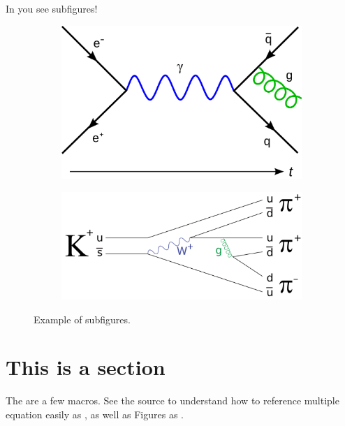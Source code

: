 \documentclass[11pt,a4paper]{article}
\begin{document}
In  you see subfigures!
%
\begin{figure}[ht]
	\centering \hspace*{-1.cm}
	\begin{subfigure}[b]{0.55\textwidth}
		\centering\includegraphics[width=1\textwidth ]{figs/Feyn1.png}
		\caption{\label{fig:Feyn2}}
	\end{subfigure}%
	\begin{subfigure}[b]{0.55\textwidth}
		\centering\includegraphics[width=1\textwidth]{figs/Feyn2.png}
		\caption{\label{fig:Feyn1}}
	\end{subfigure}
	\caption{Example of subfigures.}
	\label{fig:Feyn}
\end{figure}




\section{This is a section}\label{sec:Sec}
\setcounter{equation}{0}
%
The are a few macros. See the source to understand how to reference multiple equation easily as , as well as Figures
as .
\end{document}
